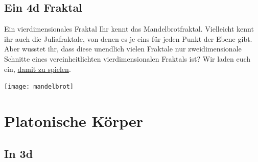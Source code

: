 \documentclass[12pt,compress,ngerman,utf8,t]{beamer}
\newcommand{\video}[2]{\movie[width=#2,height=#2,autostart,loop,poster]{}{#1}}
\newcommand{\hil}[1]{{\usebeamercolor[fg]{item}{\textbf{#1}}}}
\begin{document}


\subsection{Ein 4d Fraktal}

\begin{frame}{Ein vierdimensionales Fraktal}
  \justifying
  Ihr kennt das Mandelbrotfraktal.
  Vielleicht kennt ihr auch die Juliafraktale, von denen es je eins für jeden
  Punkt der Ebene gibt.
  Aber wusstet ihr, dass diese unendlich vielen Fraktale nur zweidimensionale
  Schnitte eines vereinheitlichten vierdimensionalen Fraktals ist?
  Wir laden euch ein,
  \href{https://rawgit.com/MatthiasHu/FractalsWebGL/4d/page.html}{damit zu spielen}.
  \bigskip

  \centering
  \texttt{[image: mandelbrot]}
  \par
\end{frame}


\section{Platonische Körper}

\newcommand{\solid}[5]{\begin{column}{0.31\textwidth}\centering\hil{#2}\par#5 E, #4 K, #3 F\\\medskip\texttt{[image: \#1]}\end{column}}
\newcommand{\solidd}[3]{\begin{column}{0.4\textwidth}\centering\hil{#2}\par#3\\\medskip\texttt{[image: \#1]}\end{column}}
\newcommand{\solidde}[3]{\begin{column}{0.33\textwidth}\centering\hil{#2}\par{\scriptsize#3\\}\medskip\texttt{[image: \#1]}\end{column}}
\newcommand{\solidv}[1]{\begin{column}{0.3\textwidth}\centering\hil{$\phantom{A}$}\par$\phantom{A}$\\\medskip\video{images/#1.mp4}{1.9cm}\end{column}}


\subsection{In 3d}
\end{document}
